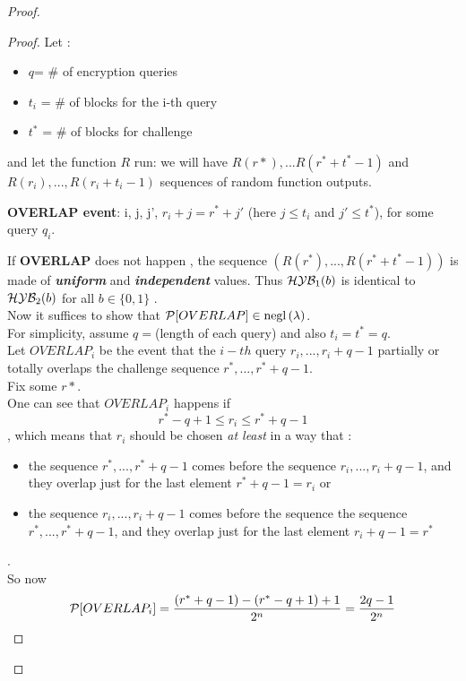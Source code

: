 \begin{proof}
    \begin{proof}
        Let :
        \begin{itemize}
            \item $q$= # of encryption queries
            \item $t_{i}$ = # of blocks for the i-th query
            \item $t^{*}$ = # of blocks for challenge
        \end{itemize}
 and let the function $R$ run: we will have 
 $R(r*), ...R(r^{*}+t^{*}-1)$ and $R(r_{i}), ..., R(r_{i}+t_{i}-1)$ sequences of random
 function outputs.

 \begin{definition}
     \textbf{OVERLAP event}: \exists i, j, j', $r_{i} + j=r^{*} + j'$ (here
     $j \leq t_{i}$ and $j' \leq t^{*}$), for some query $q_{i}$.
 \end{definition}
 
 If \textbf{OVERLAP}  does not happen , the sequence $(R(r^{*}), ...,
 R(r^{*}+t^{*}-1))$ is made of \textbf{ \textit{uniform} } and \textbf{
 \textit{independent}} values.
 Thus $\H\Y\B_{1}(b)$ is identical to $\H\Y\B_{2}(b)$ for all $b \in \{0,1\}$
 .\\

 Now it suffices to show that $ \P [ OVERLAP ] \in \negl{\lambda}  $.\\

 For simplicity, assume $q=$(length of each query) and also $t_{i}=t^{*}=q$.\\
Let $OVERLAP_{i}$ be the event that the $i-th$ query $r_{i}, ..., r_{i} + q - 1 $ 
partially or totally overlaps the challenge sequence $r^{*}, ..., r^{*} + q - 1 $.\\

Fix some $r*$.\\
One can see that $OVERLAP_{i}$ happens if 
\[
r^{*}-q+1 \leq r_{i} \leq r^{*} + q - 1
\]
, which means that $r_{i}$ should be chosen \textit{at least} in a way that :
\begin{itemize}
    \item the sequence $r^{*}, ..., r^{*} + q - 1 $ comes before the sequence $r_{i},
        ..., r_{i} + q - 1 $, and they overlap just for the last element  $r^{*}
        + q -1 = r_{i}$ or
    \item the sequence $r_{i},..., r_{i} + q - 1 $ comes before the sequence the
        sequence $r^{*}, ..., r^{*} + q - 1 $, and they overlap just for the
        last element $r_{i} + q - 1 = r^{*}$
\end{itemize}.\\
So now
\[
    \P [ OVERLAP_{i} ] = \frac{(r^{*} +q - 1) - (r^{*}-q+1) + 1}{2^{n}} =
    \frac{2q-1}{2^{n}}
\]


\end{proof}
\end{proof}
